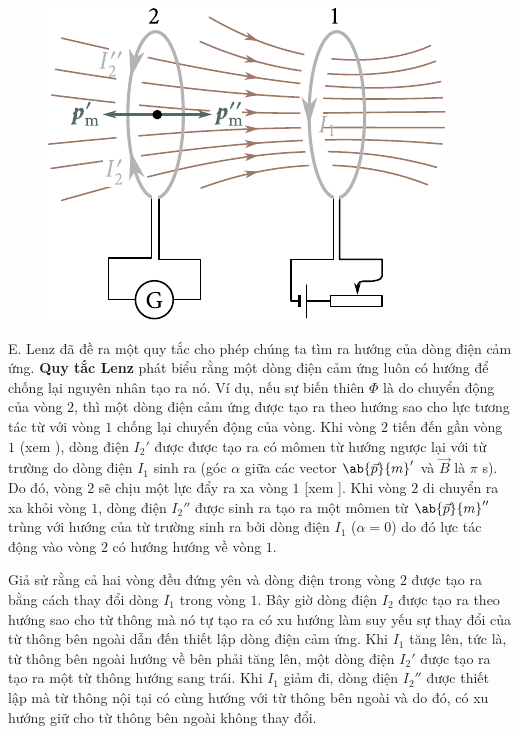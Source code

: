 \begin{figure}[!h]
	\begin{center}
		\includegraphics[scale=1]{figures/ch_08/fig_8_1.pdf}
		\caption[]{}
		\label{fig:8_1}
	\end{center}
	\vspace{-0.8cm}
\end{figure}

E. Lenz đã đề ra một quy tắc cho phép chúng ta tìm ra hướng của dòng điện cảm ứng.
\textbf{Quy tắc Lenz} phát biểu rằng một dòng điện cảm ứng luôn có hướng để chống lại nguyên nhân tạo ra nó.
Ví dụ, nếu sự biến thiên $\Phi$ là do chuyển động của vòng $2$, thì một dòng điện cảm ứng được tạo ra theo hướng sao cho lực tương tác từ với vòng $1$ chống lại chuyển động của vòng.
Khi vòng $2$ tiến đến gần vòng $1$ (xem ), dòng điện $I_2'$ được được tạo ra có mômen từ hướng ngược lại với từ trường do dòng điện $I_1$ sinh ra (góc $\alpha$ giữa các vector $\ab{\vec{p}}{m}'$ và $\vec{B}$ là $\pi$ s).
Do đó, vòng $2$ sẽ chịu một lực đẩy ra xa vòng $1$ [xem ].
Khi vòng $2$ di chuyển ra xa khỏi vòng $1$, dòng điện $I_2''$ được sinh ra tạo ra một mômen từ $\ab{\vec{p}}{m}''$ trùng với hướng của từ trường sinh ra bởi dòng điện $I_1$ ($\alpha=0$) do đó lực tác động vào vòng $2$ có hướng hướng về vòng $1$.

Giả sử rằng cả hai vòng đều đứng yên và dòng điện trong vòng $2$ được tạo ra bằng cách thay đổi dòng $I_1$ trong vòng $1$.
Bây giờ dòng điện $I_2$ được tạo ra theo hướng sao cho từ thông mà nó tự tạo ra có xu hướng làm suy yếu sự thay đổi của từ thông bên ngoài dẫn đến thiết lập dòng điện cảm ứng.
Khi $I_1$ tăng lên, tức là, từ thông bên ngoài hướng về bên phải tăng lên, một dòng điện $I_2'$ được tạo ra tạo ra một từ thông hướng sang trái.
Khi $I_1$ giảm đi, dòng điện $I_2''$ được thiết lập mà từ thông nội tại có cùng hướng với từ thông bên ngoài và do đó, có xu hướng giữ cho từ thông bên ngoài không thay đổi.


